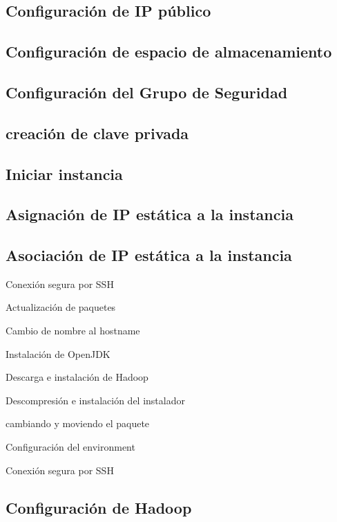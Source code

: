 \subsection{Configuración de IP público}
\lipsum[2-4]

\subsection{Configuración de espacio de almacenamiento}
\lipsum[2-4]

\subsection{Configuración del Grupo de Seguridad}
\lipsum[2-4]

\subsection{creación de clave privada}
\lipsum[2-4]

\subsection{Iniciar instancia}
\lipsum[2-4]


\subsection{Asignación de IP estática a la instancia}
\lipsum[2-4]

\subsection{Asociación de IP estática a la instancia}
\lipsum[2-4]

Conexión segura por SSH


Actualización de paquetes


Cambio de nombre al hostname

Instalación de OpenJDK


Descarga e instalación de Hadoop


Descompresión e instalación del instalador

cambiando y moviendo el paquete

Configuración del environment

Conexión segura por SSH

 

\subsection{Configuración de Hadoop}
\lipsum[2-4]


